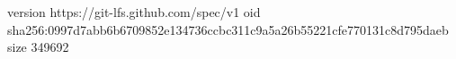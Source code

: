 version https://git-lfs.github.com/spec/v1
oid sha256:0997d7abb6b6709852e134736ccbc311c9a5a26b55221cfe770131c8d795daeb
size 349692
